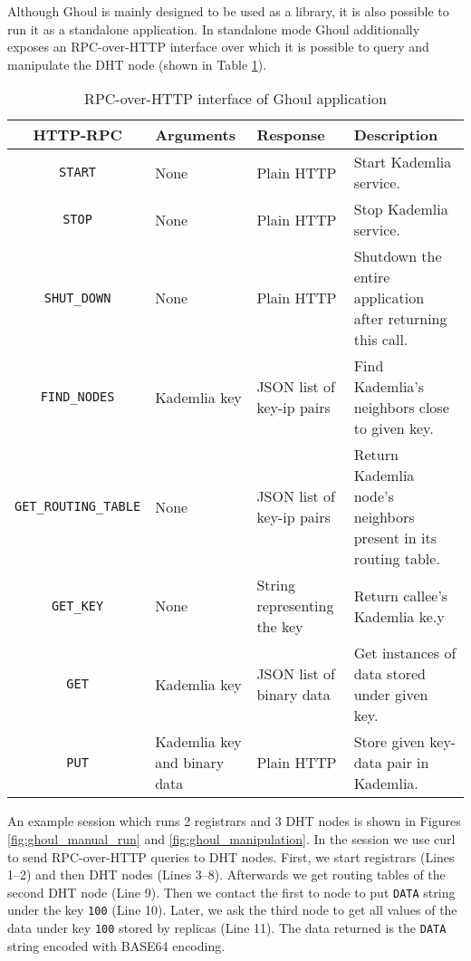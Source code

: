 Although Ghoul is mainly designed to be used as a library, it is also possible
to run it as a standalone application.
In standalone mode Ghoul additionally exposes an RPC-over-HTTP interface over
which it is possible to query and manipulate the DHT node (shown in Table
\ref{tab:http_rpc}).

\begin{table}[tbp]
  \begin{tabular}{|c|p{3cm}|p{3.6cm}|p{3.4cm}|}
    \hline
    HTTP-RPC & Arguments & Response & Description \\
    \hline
    \texttt{START} & None & Plain HTTP & Start Kademlia service.\\
    \hline
    \texttt{STOP} & None & Plain HTTP  & Stop Kademlia service.\\
    \hline
    \texttt{SHUT\_DOWN} & None & Plain HTTP &
      Shutdown the entire application after returning this call.\\
    \hline
    \texttt{FIND\_NODES} & Kademlia key & JSON list of key-ip pairs &
      Find Kademlia's neighbors close to given key.\\
    \hline
    \texttt{GET\_ROUTING\_TABLE} & None & JSON list of key-ip pairs & Return
      Kademlia node's neighbors present in its routing table.\\
    \hline
    \texttt{GET\_KEY} & None & String representing the key & Return callee's
      Kademlia ke.y\\
    \hline
    \texttt{GET} & Kademlia key  & JSON list of binary data & Get instances of
    data stored under given key. \\
    \hline
    \texttt{PUT} & Kademlia key and binary data  & Plain HTTP & Store given
    key-data pair in Kademlia. \\
    \hline
  \end{tabular}
  \caption{RPC-over-HTTP interface of Ghoul application}
  \label{tab:http_rpc}
\end{table}

An example session which runs 2 registrars and 3 DHT nodes is shown in Figures 
\ref{fig:ghoul_manual_run} and \ref{fig:ghoul_manipulation}.
In the session we use curl to send RPC-over-HTTP queries to DHT nodes.
First, we start registrars (Lines 1--2) and then DHT nodes (Lines 3--8).
Afterwards we get routing tables of the second DHT node (Line 9).
Then we contact the first to node to put \texttt{DATA} string under the key
\texttt{100} (Line 10).
Later, we ask the third node to get all values of the data under key
\texttt{100} stored by replicas (Line 11).
The data returned is the \texttt{DATA} string encoded with BASE64 encoding.

